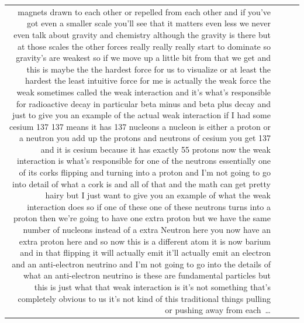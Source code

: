 \documentclass[10pt]{article}
\begin{document}
\begin{tiny}
\begin{longtable}{r p{0.3in} p{1.212in} p{3.8in}}
magnets drawn to each other or repelled from each other and if you've got even a smaller scale you'll see that it matters even less we never even talk about gravity and chemistry although the gravity is there but at those scales the other forces really really really start to dominate so gravity's are weakest so if we move up a little bit from that we get and this is maybe the the hardest force for us to visualize or at least the hardest the least intuitive force for me is actually the weak force the weak sometimes called the weak interaction and it's what's responsible for radioactive decay in particular beta minus and beta plus decay and just to give you an example of the actual weak interaction if I had some cesium 137 137 means it has 137 nucleons a nucleon is either a proton or a neutron you add up the protons and neutrons of cesium you get 137 and it is cesium because it has exactly 55 protons now the weak interaction is what's responsible for one of the neutrons essentially one of its corks flipping and turning into a proton and I'm not going to go into detail of what a cork is and all of that and the math can get pretty hairy but I just want to give you an example of what the weak interaction does so if one of these one of these neutrons turns into a proton then we're going to have one extra proton but we have the same number of nucleons instead of a extra Neutron here you now have an extra proton here and so now this is a different atom it is now barium and in that flipping it will actually emit it'll actually emit an electron and an anti-electron neutrino and I'm not going to go into the details of what an anti-electron neutrino is these are fundamental particles but this is just what that weak interaction is it's not something that's completely obvious to us it's not kind of this traditional things pulling or pushing away from each~\ldots \\

\end{longtable}
\end{tiny}
\end{document}
